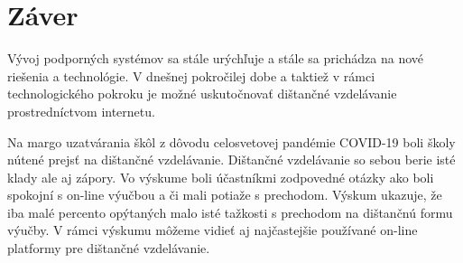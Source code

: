 \documentclass[10pt,oneside,slovak,a4paper]{article}
\begin{document}
\section*{Záver}
Vývoj podporných systémov sa stále urýchľuje a stále sa prichádza na nové riešenia a technológie. V dnešnej pokročilej dobe a taktiež v rámci technologického pokroku je možné uskutočnovať dištančné vzdelávanie prostredníctvom internetu.

Na margo uzatvárania škôl z dôvodu celosvetovej pandémie COVID-19 boli školy nútené prejsť na dištančné vzdelávanie. Dištančné vzdelávanie so sebou berie isté klady ale aj zápory. Vo výskume boli účastníkmi zodpovedné otázky ako boli spokojní s on-line výučbou a či mali potiaže s prechodom.
Výskum ukazuje, že iba malé percento opýtaných malo isté tažkosti s prechodom na dištančnú formu výučby. V rámci výskumu môžeme vidieť aj najčastejšie používané on-line platformy pre dištančné vzdelávanie.









\end{document}
